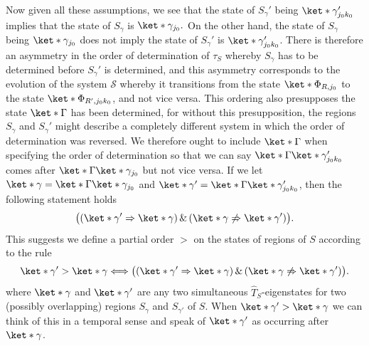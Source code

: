 \documentclass[12pt]{report}
\begin{document}
Now given all these assumptions, we see that the state of $S_{\gamma}'$ being $\ket*{\gamma_{j_0k_0}'}$ implies that the state of $S_{\gamma}$ is $\ket*{\gamma_{j_0}}.$ On the other hand, the state of $S_{\gamma}$ being $\ket*{\gamma_{j_0}}$ does not imply the state of $S_{\gamma}'$ is $\ket*{\gamma_{j_0k_0}'}$. There is therefore an asymmetry in the order of determination of $\tau_S$ whereby $S_{\gamma}$ has to be determined before $S_{\gamma}'$ is determined, and this asymmetry corresponds to the evolution of the system $\mathcal{S}$ whereby it transitions from the state $\ket*{\Phi_{R,j_0}}$ to the state $\ket*{\Phi_{R',j_0k_0}}$, and not vice versa. This ordering also presupposes the state $\ket*{\Gamma}$ has been determined, for without this presupposition, the regions  $S_{\gamma}$ and $S_{\gamma}'$ might describe a completely different system in which the order of determination was reversed. We therefore ought to include $\ket*{\Gamma}$ when specifying the order of determination so that we can say $\ket*{\Gamma}\ket*{\gamma_{j_0k_0}'}$ comes after $\ket*{\Gamma}\ket*{\gamma_{j_0}}$ but not vice versa. If we let $\ket*{\gamma}=\ket*{\Gamma}\ket*{\gamma_{j_0}}$ and $\ket*{\gamma'}=\ket*{\Gamma}\ket*{\gamma_{j_0k_0}'}$, then the following statement holds
$$\big((\ket*{\gamma'}\Rightarrow\ket*{\gamma})\,\& \,(\ket*{\gamma}\not\Rightarrow\ket*{\gamma'})\big).$$
This suggests we define a partial order $>$ 
on the states of regions of $S$ according to the rule
\begin{equation}\label{timeordering}
\ket*{\gamma'} > \ket*{\gamma}
\Longleftrightarrow 
\big((\ket*{\gamma'}\Rightarrow\ket*{\gamma})\,\& \,(\ket*{\gamma}\not\Rightarrow\ket*{\gamma'})\big).
\end{equation}%
%
where $\ket*{\gamma}$ and $\ket*{\gamma'}$ are any two simultaneous $\hat{T}_S$-eigenstates for two (possibly overlapping) regions $S_\gamma$ and $S_{\gamma'}$ of $S$. When $\ket*{\gamma'} > \ket*{\gamma}$ we can think of this in a temporal sense and speak of $\ket*{\gamma'}$ as occurring after $\ket*{\gamma}$.
\end{document}
